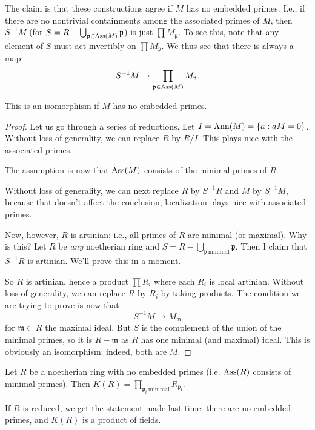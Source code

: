 The claim is that these constructions agree if $M$ has no embedded primes.
I.e., if there are no nontrivial containments among the associated primes of
$M$, then $S^{-1}M$ (for $S =  R - \bigcup_{\mathfrak{p} \in \operatorname{Ass}(M)}
\mathfrak{p}$)
is just $\prod M_{\mathfrak{p}}$.
To see this, note that any element of $S$ must act invertibly on $\prod
M_{\mathfrak{p}}$. We thus see that there is always a map
\[ S^{-1}M \to \prod_{\mathfrak{p} \in \operatorname{Ass}(M)} M_{\mathfrak{p}} . \]
\begin{proposition}
This is an isomorphism if $M$ has no embedded primes.
\end{proposition}

\begin{proof}
Let us go through a series of reductions. Let $I = \operatorname{Ann}(M) = \left\{a: aM
= 0\right\}$. Without loss of generality, we can replace $R $ by $R/I$. This plays nice with the
associated primes.

The assumption is now that $\operatorname{Ass}(M)$ consists of the minimal
primes of $R$.

Without loss of generality, we can next replace $R$ by $S^{-1}R$ and $M$ by
$S^{-1}M$, because that doesn't affect the conclusion; localization plays nice
with associated primes.

Now, however, $R$ is artinian: i.e., all primes of $R$ are minimal (or
maximal). Why is this?
Let $R$ be \emph{any} noetherian ring and $S = R - \bigcup_{\mathfrak{p} \
\mathrm{minimal}} \mathfrak{p}$. Then I claim that $S^{-1}R$ is artinian. We'll
prove this in a moment.

So $R$ is artinian, hence a product $\prod R_i$ where each $R_i$ is local
artinian. Without loss of generality, we can replace $R$ by $R_i$ by taking
products. The condition we are trying to prove is now that
\[ S^{-1}M \to M_{\mathfrak{m}}  \]
for $\mathfrak{m} \subset R$ the maximal ideal. But $S$ is the complement of
the union of the minimal primes, so it is $R - \mathfrak{m}$ as $R$ has one
minimal (and maximal) ideal.  This is obviously an isomorphism: indeed, both
are $M$.
\end{proof}

\begin{corollary}
Let $R$ be a noetherian ring with no embedded primes (i.e. $\operatorname{Ass}(R)$ consists
of minimal primes).
Then $K(R) = \prod_{\mathfrak{p}_i \ \mathrm{minimal}} R_{\mathfrak{p_i}}$.
\end{corollary}
If $R$ is reduced, we get the statement made last time: there are no
embedded primes, and $K(R)$ is a product of
fields.

